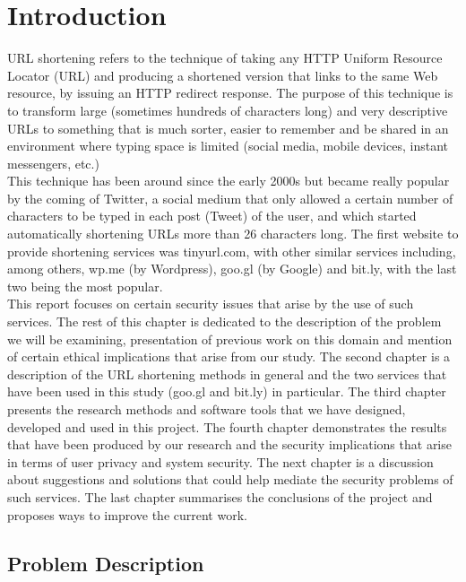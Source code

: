 \documentclass[12pt]{article}
\begin{document}
\section{Introduction}
%
URL shortening refers to the technique of taking any HTTP Uniform Resource Locator (URL) and producing a shortened version that links to the same Web resource, by issuing an HTTP redirect response. The purpose of this technique is to transform large (sometimes hundreds of characters long) and very descriptive URLs to something that is much sorter, easier to remember and be shared in an environment where typing space is limited (social media, mobile devices, instant messengers, etc.)\\
This technique has been around since the early 2000s but became really popular by the coming of Twitter, a social medium that only allowed a certain number of characters to be typed in each post (Tweet) of the user, and which started automatically shortening URLs more than 26 characters long. The first website to provide shortening services was tinyurl.com, with other similar services including, among others, wp.me (by Wordpress), goo.gl (by Google) and bit.ly, with the last two being the most popular. \\
This report focuses on certain security issues that arise by the use of such services. The rest of this chapter is dedicated to the description of the problem we will be examining, presentation of previous work on this domain and mention of certain ethical implications that arise from our study. The second chapter is a description of the URL shortening methods in general and the two services that have been used in this study (goo.gl and bit.ly) in particular. The third chapter presents the research methods and software tools that we have designed, developed and used in this project. The fourth chapter demonstrates the results that have been produced by our research and the security implications that arise in terms of user privacy and system security. The next chapter is a discussion about suggestions and solutions that could help mediate the security problems of such services. The last chapter summarises the conclusions of the project and proposes ways to improve the current work. 

\subsection{Problem Description}
\end{document}
